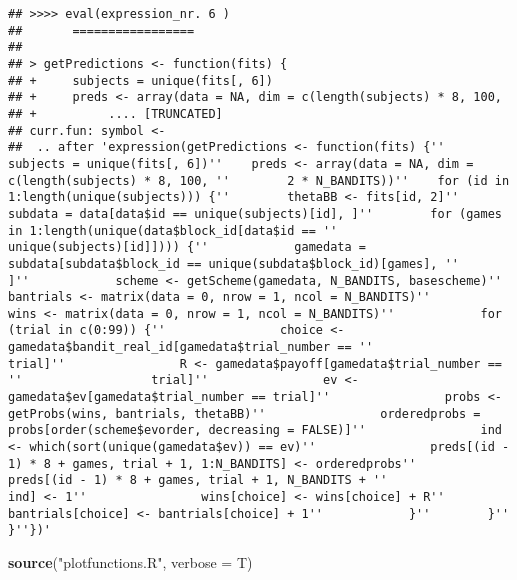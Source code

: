\documentclass[11pt,,]{article}
\newenvironment{Shaded}{\begin{snugshade}}{\end{snugshade}}
\newcommand{\KeywordTok}[1]{\textcolor[rgb]{0.13,0.29,0.53}{\textbf{{#1}}}}
\newcommand{\DataTypeTok}[1]{\textcolor[rgb]{0.13,0.29,0.53}{{#1}}}
\newcommand{\StringTok}[1]{\textcolor[rgb]{0.31,0.60,0.02}{{#1}}}
\newcommand{\NormalTok}[1]{{#1}}
\begin{document}
\begin{verbatim}
## >>>> eval(expression_nr. 6 )
##       =================
## 
## > getPredictions <- function(fits) {
## +     subjects = unique(fits[, 6])
## +     preds <- array(data = NA, dim = c(length(subjects) * 8, 100, 
## +          .... [TRUNCATED] 
## curr.fun: symbol <-
##  .. after 'expression(getPredictions <- function(fits) {''    subjects = unique(fits[, 6])''    preds <- array(data = NA, dim = c(length(subjects) * 8, 100, ''        2 * N_BANDITS))''    for (id in 1:length(unique(subjects))) {''        thetaBB <- fits[id, 2]''        subdata = data[data$id == unique(subjects)[id], ]''        for (games in 1:length(unique(data$block_id[data$id == ''            unique(subjects)[id]]))) {''            gamedata = subdata[subdata$block_id == unique(subdata$block_id)[games], ''                ]''            scheme <- getScheme(gamedata, N_BANDITS, basescheme)''            bantrials <- matrix(data = 0, nrow = 1, ncol = N_BANDITS)''            wins <- matrix(data = 0, nrow = 1, ncol = N_BANDITS)''            for (trial in c(0:99)) {''                choice <- gamedata$bandit_real_id[gamedata$trial_number == ''                  trial]''                R <- gamedata$payoff[gamedata$trial_number == ''                  trial]''                ev <- gamedata$ev[gamedata$trial_number == trial]''                probs <- getProbs(wins, bantrials, thetaBB)''                orderedprobs = probs[order(scheme$evorder, decreasing = FALSE)]''                ind <- which(sort(unique(gamedata$ev)) == ev)''                preds[(id - 1) * 8 + games, trial + 1, 1:N_BANDITS] <- orderedprobs''                preds[(id - 1) * 8 + games, trial + 1, N_BANDITS + ''                  ind] <- 1''                wins[choice] <- wins[choice] + R''                bantrials[choice] <- bantrials[choice] + 1''            }''        }''    }''})'
\end{verbatim}

\begin{Shaded}
\begin{Highlighting}[]
\KeywordTok{source}\NormalTok{(}\StringTok{"plotfunctions.R"}\NormalTok{, }\DataTypeTok{verbose =} \NormalTok{T)}
\end{Highlighting}
\end{Shaded}
\end{document}
